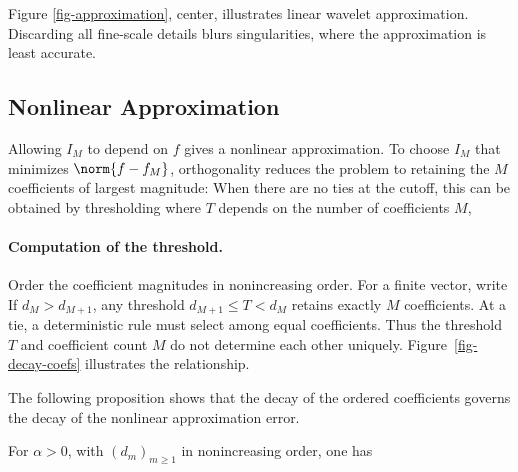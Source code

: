 
Figure \ref{fig-approximation}, center, illustrates linear wavelet approximation. Discarding all fine-scale details blurs singularities, where the approximation is least accurate.

                                           
\subsection{Nonlinear Approximation}

Allowing $I_M$ to depend on $f$ gives a nonlinear approximation. To choose $I_M$ that minimizes $\norm{f-f_M}$, orthogonality reduces the problem to retaining the $M$ coefficients of largest magnitude:
When there are no ties at the cutoff, this can be obtained by thresholding
where $T$ depends on the number of coefficients $M$, 

  
\paragraph{Computation of the threshold.}

Order the coefficient magnitudes in nonincreasing order. For a finite vector, write
If $d_M>d_{M+1}$, any threshold $d_{M+1}\leq T<d_M$ retains exactly $M$ coefficients. At a tie, a deterministic rule must select among equal coefficients. Thus the threshold $T$ and coefficient count $M$ do not determine each other uniquely. Figure~\ref{fig-decay-coefs} illustrates the relationship.

The following proposition shows that the decay of the ordered coefficients governs the decay of the nonlinear approximation error.

\begin{prop}\label{prop-equiv-comp-decay}
For $\alpha>0$, with $(d_m)_{m\geq1}$ in nonincreasing order, one has
\end{prop}

